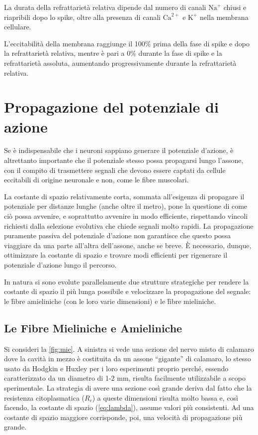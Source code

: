 La durata della refrattarietà relativa dipende dal numero di canali \( \text{Na}^+ \) chiusi e riapribili dopo lo spike, oltre alla presenza di canali \( \text{Ca}^{2+} \) e \( \text{K}^+ \) nella membrana cellulare.

L'eccitabilità della membrana raggiunge il 100\% prima della fase di spike e dopo la refrattarietà relativa, mentre è pari a 0\% durante la fase di spike e la refrattarietà assoluta, aumentando progressivamente durante la refrattarietà relativa.


\section{Propagazione del potenziale di azione}
Se è indispensabile che i neuroni sappiano generare il potenziale d'azione, è altrettanto importante che il potenziale stesso possa propagarsi lungo l'assone, con il compito di trasmettere segnali che devono essere captati da cellule eccitabili di origine neuronale e non, come le fibre muscolari.

La costante di spazio relativamente corta, sommata all'esigenza di propagare il potenziale per distanze lunghe (anche oltre il metro), pone la questione di come ciò possa avvenire, e soprattutto avvenire in modo efficiente, rispettando vincoli richiesti dalla selezione evolutiva che chiede segnali molto rapidi. La propagazione puramente passiva del potenziale d'azione non garantisce che questo possa viaggiare da una parte all'altra dell'assone, anche se breve. È necessario, dunque, ottimizzare la costante di spazio e trovare modi efficienti per rigenerare il potenziale d'azione lungo il percorso.


In natura si sono evolute parallelamente due strutture strategiche per rendere la costante di spazio il più lunga possibile e velocizzare la propagazione del segnale: le \h{fibre amieliniche} (con le loro varie dimensioni) e le \h{fibre mieliniche}.

\subsection{Le Fibre Mieliniche e Amieliniche}
Si consideri la \autoref{fig:mie}. A sinistra si vede una sezione del nervo misto di calamaro dove la cavità in mezzo è costituita da un assone ``gigante'' di calamaro, lo stesso usato da Hodgkin e Huxley per i loro esperimenti proprio perché, essendo caratterizzato da un diametro di 1-2 mm, risulta facilmente utilizzabile a scopo sperimentale. La strategia di avere una sezione così grande deriva dal fatto che la resistenza citoplasmatica ($R_c$) a queste dimensioni risulta molto bassa e, così facendo, la costante di spazio (\autoref{eq:lambda}), assume valori più consistenti. Ad una costante di spazio maggiore corrisponde, poi, una velocità di propagazione più grande.

